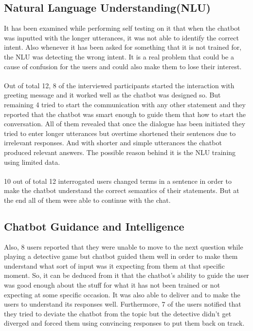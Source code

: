 \subsection{Natural Language Understanding(NLU)}
It has been examined while performing self testing on it that when the chatbot was inputted with the longer utterances, it was not able to identify the correct intent. Also whenever it has been asked for something that it is not trained for, the NLU was detecting the wrong intent. It is a real problem that could be a cause of confusion for the users and could also make them to lose their interest.
\\~\\
Out of total 12, 8 of the interviewed participants started the interaction with greeting message and it worked well as the chatbot was designed so. But remaining 4 tried to start the communication with any other statement and they reported that the chatbot was smart enough to guide them that how to start the conversation. All of them revealed that once the dialogue has been initiated they tried to enter longer utterances but overtime shortened their sentences due to irrelevant responses. And with shorter and simple utterances the chatbot produced relevant answers. The possible reason behind it is the NLU training using limited data.
\\~\\
10 out of total 12 interrogated users changed terms in a sentence in order to make the chatbot understand the correct semantics of their statements. But at the end all of them were able to continue with the chat.

\subsection{Chatbot Guidance and Intelligence}
Also, 8 users reported that they were unable to move to the next question while playing a detective game but chatbot guided them well in order to make them understand what sort of input was it expecting from them at that specific moment. So, it can be deduced from it that the chatbot's ability to guide the user was good enough about the stuff for what it has not been trained or not expecting at some specific occasion. It was also able to deliver and to make the users to understand its responses well. Furthermore, 7 of the users notified that they tried to deviate the chatbot from the topic but the detective didn't get diverged and forced them using convincing responses to put them back on track.

